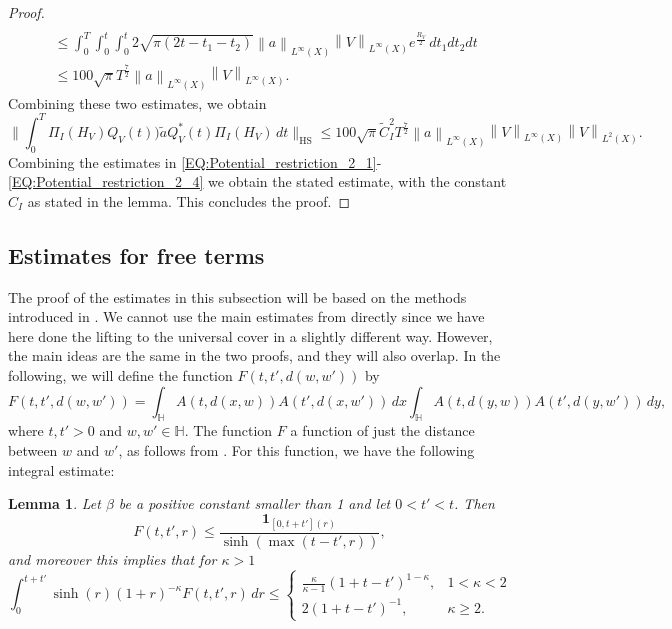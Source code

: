 \documentclass[11pt,twoside,reqno]{amsart}
\newcommand{\bH}{\mathbb{H}}
\newcommand{\1}{\mathrm{\mathbf{1}}}
\newcommand{\bHS}{\mathrm{HS}}
\newcommand{\norm}[1]{\left\lVert#1\right\rVert}
\numberwithin{equation}{section}
\theoremstyle{plain}
\newtheorem{lemma}[thm]{Lemma}
\theoremstyle{definition}
\theoremstyle{remark}
\begin{document}
\begin{proof}
\begin{equation*}
\begin{aligned}
        \\
       &\leq \int_0^T \int_{0}^t \int_{0}^t 2 \sqrt{\pi(2t - t_1-t_2)} \norm{a}_{L^\infty(X)}\norm{V}_{L^\infty(X)} e^{\frac{R_V}{2}}  \, d t_1  d t_2  d t
       \\
       &\leq 100\sqrt{\pi} T^{\frac{7}{2}} \norm{a}_{L^\infty(X)}\norm{V}_{L^\infty(X)}.
    \end{aligned}
\end{equation*}
Combining these two estimates, we obtain
\begin{equation}\label{EQ:Potential_restriction_2_4}
       \Big\lVert \int_0^T \Pi_I(H_V) Q_V(t))\tilde{a} Q_V^*(t) \Pi_I(H_V) \, d t \Big\rVert_{\bHS}
      \leq  100\sqrt{\pi} \tilde{C}_I^2 T^{\frac{7}{2}} \norm{a}_{L^\infty(X)}\norm{V}_{L^\infty(X)} \norm{V}_{L^2(X)}.
\end{equation}
Combining the estimates in \eqref{EQ:Potential_restriction_2_1}-\eqref{EQ:Potential_restriction_2_4} we obtain the stated estimate, with the constant $C_I$ as stated in the lemma. This concludes the proof.
\end{proof}

\subsection{Estimates for free terms}

The proof of the estimates in this subsection will be based on the methods introduced in \cite{Hippi}. We cannot use the main estimates from \cite{Hippi} directly since we have here done the lifting to the universal cover in a slightly different way. However, the main ideas are the same in the two proofs, and they will also overlap. In the following, we will define the function  $F(t,t',d(w,w'))$ by
\begin{equation}\label{def_of_F}
   F(t,t',d(w,w')) = \int_{\bH} A(t,d(x,w))   A(t',d(x,w'))  \,d x \int_{\bH}    A(t,d(y,w))   A(t',d(y,w'))  \,d y,
\end{equation} 
where $t,t'>0$ and $w,w'\in\bH$. The function $F$ a function of just the distance between $w$ and $w'$, as follows from \cite[Lemma 7.1]{Hippi}. For this function, we have the following integral estimate:
\begin{lemma}\label{LE:int_est_after_exp_mix}
    Let $\beta$ be a positive constant smaller than 1 and let $0<t'<t$. Then
    \begin{equation}\label{LEEQ:int_est_after_exp_mix_1}
       F(t,t',r)\leq \frac{\boldsymbol{1}_{[0,t+t'](r)}}{\sinh(\max(t-t',r))},
    \end{equation}
    and moreover this implies that for $\kappa>1$
    \begin{equation}\label{LEEQ:int_est_after_exp_mix_2}
        \int_{0}^{t+t'} \sinh(r) (1+r)^{-\kappa}   F(t,t',r)\, d r \leq \begin{cases} \frac{\kappa}{\kappa-1}(1+t-t')^{1-\kappa}, & 1 < \kappa < 2 \\ 
        2(1+t-t')^{-1},& \kappa \geq 2.
        \end{cases}
    \end{equation}
\end{lemma}
\end{document}
